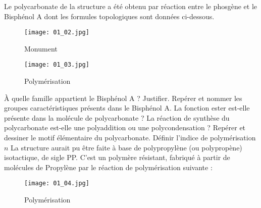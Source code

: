 \documentclass{exam}
\begin{document}
Le polycarbonate de la structure a été obtenu par réaction entre le phosgène et le Bisphénol A dont les formules topologiques sont données ci-dessous.

\begin{figure}[H]
  \centering
  \texttt{[image: 01\_02.jpg]}
  \caption{Monument}
\end{figure} 

\begin{figure}[H]
  \centering
  \texttt{[image: 01\_03.jpg]}
  \caption{Polymérisation}
\end{figure} 

\begin{questions}
  \question[0.5] À quelle famille appartient le Bisphénol A ? Justifier.
  \question[1] Repérer et nommer les groupes caractéristiques présents dans le Bisphénol A.
  \question[0.5] La fonction ester est-elle présente dans la molécule de polycarbonate ?
  \question[1] La réaction de synthèse du polycarbonate est-elle une polyaddition ou une polycondensation ?
  \question[1] Repérer et dessiner le motif élémentaire du polycarbonate.
  \question[1] Définir l'indice de polymérisation $n$
  \question[2.5] La structure aurait pu être faite à base de polypropylène (ou polypropène) isotactique, de sigle PP. C'est un polymère résistant, fabriqué à partir de molécules de Propylène par le réaction de polymérisation suivante : 
  
  \begin{figure}[H]
    \centering
    \texttt{[image: 01\_04.jpg]}
    \caption{Polymérisation}
  \end{figure} 
 
  

\end{questions}
\end{document}
